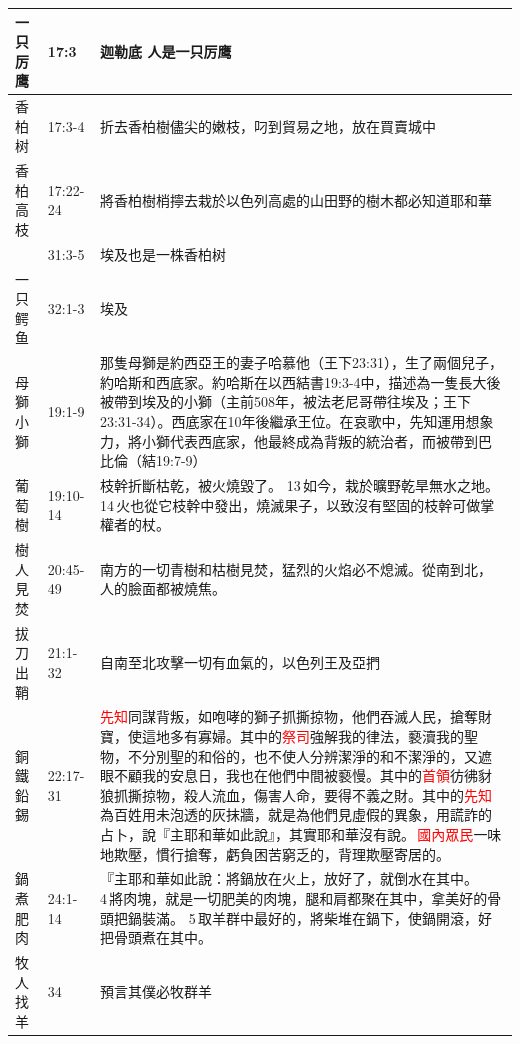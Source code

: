 \begin{table}[H]
\begin{tabular}{p{1.75cm}|p{1.50cm}|p{13.0cm}}
一只厉鹰&17:3&迦勒底 人是一只厉鹰\\\hline
香柏树&17:3-4&折去香柏樹儘尖的嫩枝，叼到貿易之地，放在買賣城中\\\hline
香柏高枝&17:22-24&將香柏樹梢擰去栽於以色列高處的山田野的樹木都必知道耶和華\\\hline
&31:3-5&埃及也是一株香柏树\\\hline
一只鳄鱼&32:1-3&埃及\\\hline
母獅小獅&19:1-9&那隻母獅是約西亞王的妻子哈慕他（王下23:31），生了兩個兒子，約哈斯和西底家。約哈斯在以西結書19:3-4中，描述為一隻長大後被帶到埃及的小獅（主前508年，被法老尼哥帶往埃及；王下23:31-34）。西底家在10年後繼承王位。在哀歌中，先知運用想象力，將小獅代表西底家，他最終成為背叛的統治者，而被帶到巴比倫（結19:7-9）\\\hline
葡萄樹&19:10-14&枝幹折斷枯乾，被火燒毀了。 13 如今，栽於曠野乾旱無水之地。 14 火也從它枝幹中發出，燒滅果子，以致沒有堅固的枝幹可做掌權者的杖。\\\hline
樹人見焚&20:45-49&南方的一切青樹和枯樹見焚，猛烈的火焰必不熄滅。從南到北，人的臉面都被燒焦。\\\hline
拔刀出鞘&21:1-32&自南至北攻擊一切有血氣的，以色列王及亞捫\\\hline
銅鐵鉛錫&22:17-31&\textcolor{red}{先知}同謀背叛，如咆哮的獅子抓撕掠物，他們吞滅人民，搶奪財寶，使這地多有寡婦。其中的\textcolor{red}{祭司}強解我的律法，褻瀆我的聖物，不分別聖的和俗的，也不使人分辨潔淨的和不潔淨的，又遮眼不顧我的安息日，我也在他們中間被褻慢。其中的\textcolor{red}{首領}彷彿豺狼抓撕掠物，殺人流血，傷害人命，要得不義之財。其中的\textcolor{red}{先知}為百姓用未泡透的灰抹牆，就是為他們見虛假的異象，用謊詐的占卜，說『主耶和華如此說』，其實耶和華沒有說。\textcolor{red}{ 國內眾民}一味地欺壓，慣行搶奪，虧負困苦窮乏的，背理欺壓寄居的。 \\\hline


鍋煮肥肉&24:1-14&『主耶和華如此說：將鍋放在火上，放好了，就倒水在其中。 4 將肉塊，就是一切肥美的肉塊，腿和肩都聚在其中，拿美好的骨頭把鍋裝滿。 5 取羊群中最好的，將柴堆在鍋下，使鍋開滾，好把骨頭煮在其中。\\\hline
牧人找羊&34&預言其僕必牧群羊\\\hline

\end{tabular}
\end{table}



